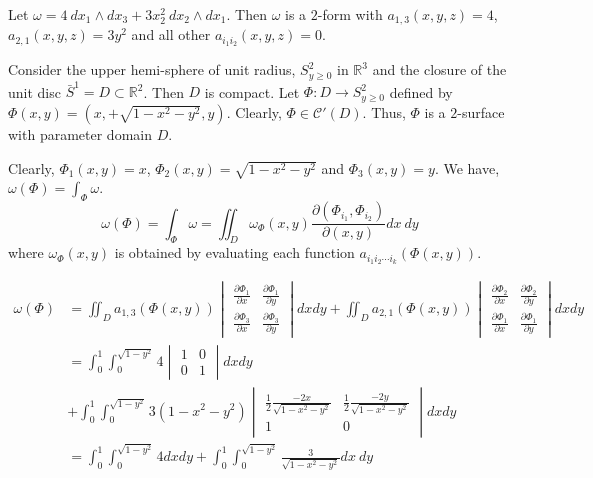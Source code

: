 \begin{commentary}
	Let $\omega = 4\ dx_1 \wedge dx_3 + 3x_2^2\ dx_2 \wedge dx_1$.
	Then $\omega$ is a $2$-form with $a_{1,3}(x,y,z) = 4$, $a_{2,1}(x,y,z) = 3y^2$ and all other $a_{i_1 i_2}(x,y,z) = 0$.

	Consider the upper hemi-sphere of unit radius, $S^2_{y \ge 0}$ in $\mathbb{R}^3$ and the closure of the unit disc $\bar{S}^1 = D \subset \mathbb{R}^2$.
	Then $D$ is compact.
	Let $\Phi : D \to S^2_{y \ge 0}$ defined by $\Phi(x,y) = (x,+\sqrt{1-x^2-y^2},y)$.
	Clearly, $\Phi \in \mathscr{C}'(D)$.
	Thus, $\Phi$ is a $2$-surface with parameter domain $D$.

	Clearly, $\Phi_1(x,y) = x$, $\Phi_2(x,y) = \sqrt{1-x^2-y^2}$ and $\Phi_3(x,y) = y$.
	We have, $\omega(\Phi) = \int_\Phi \omega$.
	\begin{equation}
		\omega(\Phi) = \int_\Phi \omega =  \iint_D \omega_\Phi(x,y) \frac{\partial ( \Phi_{i_1}, \Phi_{i_2})}{\partial ( x, y) } dx\ dy
	\end{equation}
	where $\omega_{\Phi}(x,y)$ is obtained by evaluating each function $a_{i_1 i_2 \dotsm i_k}(\Phi(x,y))$.

	\begin{align*}
		\omega(\Phi) & = \iint_D a_{1,3}(\Phi(x,y)) \begin{vmatrix} \frac{\partial \Phi_1}{\partial x} & \frac{\partial \Phi_1}{\partial y} \\
		\frac{\partial \Phi_3}{\partial x} & \frac{\partial \Phi_3}{\partial y} \end{vmatrix} dx dy + \iint_D a_{2,1}(\Phi(x,y)) \begin{vmatrix} \frac{\partial \Phi_2}{\partial x} & \frac{\partial \Phi_2}{\partial y} \\
		\frac{\partial \Phi_1}{\partial x} & \frac{\partial \Phi_1}{\partial y} \end{vmatrix} dx dy \\
		& = \int_0^1 \int_0^{\sqrt{1-y^2}} 4 \begin{vmatrix} 1 & 0 \\ 0 & 1 \end{vmatrix} dx dy \\
		& + \int_0^1 \int_0^{\sqrt{1-y^2}} 3(1-x^2-y^2) \begin{vmatrix} \frac{1}{2}\frac{-2x}{\sqrt{1-x^2-y^2}} & \frac{1}{2} \frac{-2y}{\sqrt{1-x^2-y^2}} \\ 1 & 0 \end{vmatrix} dx dy \\
		& = \int_0^1 \int_0^{\sqrt{1-y^2}} 4 dx dy + \int_0^1 \int_0^{\sqrt{1-y^2}} \frac{3}{\sqrt{1-x^2-y^2}} dx\ dy
	\end{align*}
\end{commentary}

